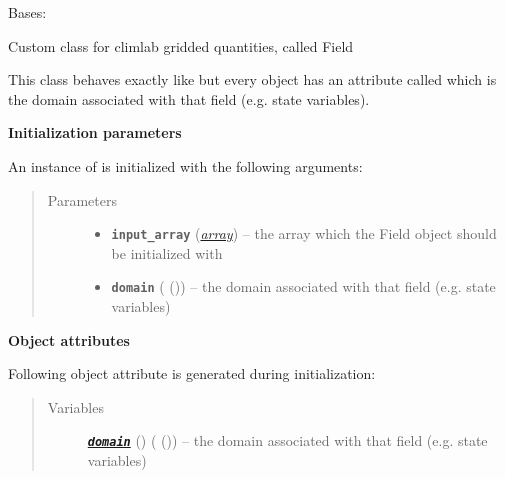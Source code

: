 \documentclass[a4paper,10pt,english]{sphinxmanual}
\begin{document}
\begin{fulllineitems}
\label{api/climlab.domain:climlab.domain.field.Field}
Bases: \href{http://docs.scipy.org/doc/numpy/reference/generated/numpy.ndarray.html\#numpy.ndarray}{}

Custom class for climlab gridded quantities, called Field

This class behaves exactly like \href{http://docs.scipy.org/doc/numpy/reference/generated/numpy.ndarray.html\#numpy.ndarray}{}
but every object has an attribute called 
which is the domain associated with that field (e.g. state variables).

\textbf{Initialization parameters}

An instance of  is initialized with the following 
arguments:
\begin{quote}\begin{description}
\item[{Parameters}] \leavevmode\begin{itemize}
\item {} 
\textbf{\texttt{input\_array}} (\href{http://docs.python.org/2.7/library/array.html\#module-array}{\emph{array}}) -- the array which the Field object should be 
initialized with

\item {} 
\textbf{\texttt{domain}} ({\hyperref[api/climlab.domain:climlab.domain.domain._Domain]{\emph{}}} ()) -- the domain associated with that field 
(e.g. state variables)

\end{itemize}

\end{description}\end{quote}

\textbf{Object attributes}

Following object attribute is generated during initialization:
\begin{quote}\begin{description}
\item[{Variables}] \leavevmode
{\hyperref[api/climlab.domain:module\string-climlab.domain.domain]{\emph{\textbf{\texttt{domain}}}}} () ({\hyperref[api/climlab.domain:climlab.domain.domain._Domain]{\emph{}}} ()) -- the domain associated with that field 
(e.g. state variables)


\end{description}
\end{quote}
\end{fulllineitems}
\end{document}
